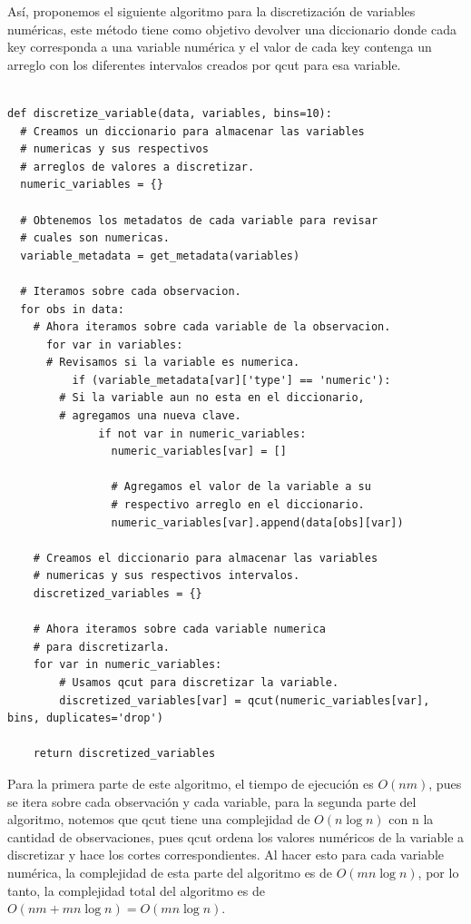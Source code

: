 \documentclass[
 12pt,
 letterpaper,
]{article}
\theoremstyle{teoremaBreak}
\theoremstyle{plain}
\theoremstyle{definition}
\begin{document}
Así, proponemos el siguiente algoritmo para la discretización de variables numéricas, este método tiene como 
objetivo devolver una diccionario donde cada key corresponda a una variable numérica y el valor de cada key 
contenga un arreglo con los diferentes intervalos creados por qcut para esa variable.

\begin{lstlisting}[style=pseudocodigo]

def discretize_variable(data, variables, bins=10):
  # Creamos un diccionario para almacenar las variables
  # numericas y sus respectivos 
  # arreglos de valores a discretizar.
  numeric_variables = {}

  # Obtenemos los metadatos de cada variable para revisar 
  # cuales son numericas.
  variable_metadata = get_metadata(variables)

  # Iteramos sobre cada observacion.
  for obs in data:
    # Ahora iteramos sobre cada variable de la observacion.
      for var in variables:
      # Revisamos si la variable es numerica.
          if (variable_metadata[var]['type'] == 'numeric'):
        # Si la variable aun no esta en el diccionario,
        # agregamos una nueva clave.
              if not var in numeric_variables:
                numeric_variables[var] = []
                
                # Agregamos el valor de la variable a su 
                # respectivo arreglo en el diccionario.
                numeric_variables[var].append(data[obs][var])

    # Creamos el diccionario para almacenar las variables 
    # numericas y sus respectivos intervalos.
    discretized_variables = {}

    # Ahora iteramos sobre cada variable numerica 
    # para discretizarla.
    for var in numeric_variables:
        # Usamos qcut para discretizar la variable.
        discretized_variables[var] = qcut(numeric_variables[var], bins, duplicates='drop')

    return discretized_variables
\end{lstlisting}

Para la primera parte de este algoritmo, el tiempo de ejecución es $O(nm)$, pues se itera sobre 
cada observación y cada variable, para la segunda parte del algoritmo, notemos que qcut tiene una complejidad 
de $O(n \log n)$ con n la cantidad de observaciones, pues qcut ordena los valores numéricos de la 
variable a discretizar y hace los cortes correspondientes. Al hacer esto para cada variable numérica, la complejidad 
de esta parte del algoritmo es de $O(m n \log n)$, por lo tanto, la complejidad total del algoritmo es 
de $O(nm + m n \log n) = O(m n \log n)$.
\end{document}
